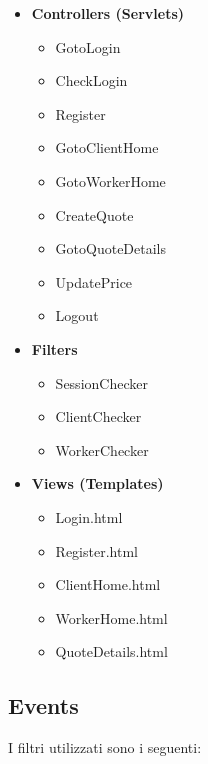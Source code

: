 \documentclass[a4paper, 12pt]{article}
\begin{document}
\begin{itemize}
\begin{itemize}
\begin{itemize}
	\end{itemize}
\end{itemize}
\item \textbf{Controllers (Servlets)}
\begin{itemize}
	\item GotoLogin
	\item CheckLogin
	\item Register
	\item GotoClientHome
	\item GotoWorkerHome
	\item CreateQuote
	\item GotoQuoteDetails
	\item UpdatePrice
	\item Logout
\end{itemize}
\item \textbf{Filters}
\begin{itemize}
	\item SessionChecker
	\item ClientChecker
	\item WorkerChecker
\end{itemize}
\item \textbf{Views (Templates)}
\begin{itemize}
\item Login.html
\item Register.html
\item ClientHome.html
\item WorkerHome.html
\item QuoteDetails.html
\end{itemize}
\end{itemize}

\subsection{Events}
I filtri utilizzati sono i seguenti:\\
\end{document}
